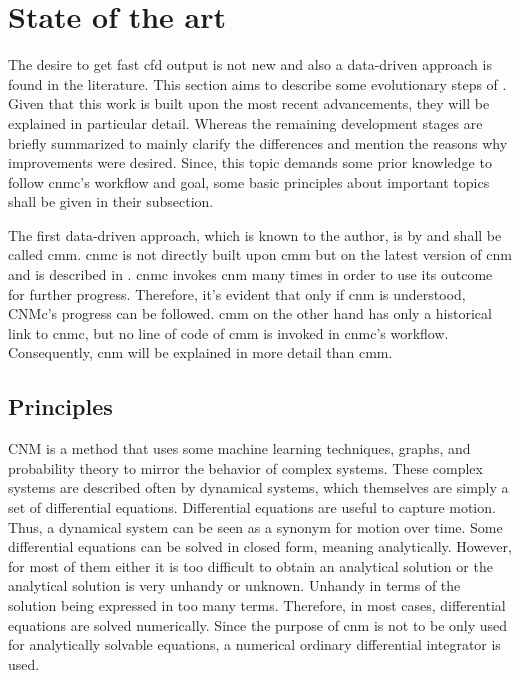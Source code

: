 
\section{State of the art}
\label{sec_1_1_State}

The desire to get fast \gls{cfd} output is not new and also
a data-driven approach is found in the literature. 
This section aims to describe some evolutionary steps of .  Given that this work is built upon the most recent advancements,
they will be explained in particular detail.
Whereas the remaining development stages are briefly 
summarized to mainly clarify the differences and  
mention the reasons why improvements were desired. Since, this topic 
demands some prior knowledge to follow \gls{cnmc}'s workflow and goal, some basic principles about important topics shall be given in their subsection.\newline

The first data-driven approach, which is known to the author, 
is by \cite[]{Kaiser2014} and shall be called \gls{cmm}.
\gls{cnmc} is not directly built upon \gls{cmm} but on the latest version 
of \gls{cnm} and is described in \cite[]{Fernex2021}.
\gls{cnmc} invokes \gls{cnm} many times in order to use 
its outcome for further progress. Therefore, it's evident that only if \gls{cnm} is understood, CNMc's
progress can be followed. \gls{cmm} on the other hand has only a historical link to \gls{cnmc}, but no line of code of \gls{cmm} is invoked in \gls{cnmc}'s workflow. Consequently, \gls{cnm} will be explained in more detail than \gls{cmm}.

\subsection{Principles}
\label{subsec_1_1_1_Principles}
CNM \cite[]{Fernex2021} is a method that uses some machine learning 
techniques, graphs, and probability theory to mirror the behavior of 
complex systems. These complex systems are described often by dynamical systems, which themselves are simply a set of 
differential equations. Differential equations are useful to 
capture motion. Thus, a dynamical system can be seen as a synonym for motion
over time. Some differential equations can be 
solved in closed form, meaning analytically. However, for most of them 
either it is too difficult to obtain an analytical solution or the 
analytical solution is very unhandy or unknown. Unhandy in terms of the solution
being expressed in too many terms. Therefore, in most 
cases, differential equations are solved numerically. Since 
the purpose of \gls{cnm} is not to be only used for analytically 
solvable equations, a numerical ordinary differential integrator 
is used. \newline 

